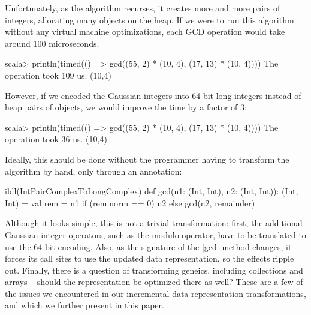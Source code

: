 Unfortunately, as the algorithm recurses, it creates more and more pairs of integers, allocating many objects on the heap. If we were to run this algorithm without any virtual machine optimizations, each GCD operation would take around 100 microseconds.

\begin{lstlisting-nobreak}
scala> println(timed(() => gcd((55, 2) * (10, 4), (17, 13) * (10, 4))))
The operation took 109 us.
(10,4)
\end{lstlisting-nobreak}

However, if we encoded the Gaussian integers into 64-bit long integers instead of heap pairs of objects, we would improve the time by a factor of 3:

\begin{lstlisting-nobreak}
scala> println(timed(() => gcd((55, 2) * (10, 4), (17, 13) * (10, 4))))
The operation took 36 us.
(10,4)
\end{lstlisting-nobreak}

Ideally, this should be done without the programmer having to transform the algorithm by hand, only through an annotation:

\begin{lstlisting-nobreak}
ildl(IntPairComplexToLongComplex) {
  def gcd(n1: (Int, Int), n2: (Int, Int)): (Int, Int) = {
    val rem = n1 %
    if (rem.norm == 0) n2 else gcd(n2, remainder)
  }
}
\end{lstlisting-nobreak}

Although it looks simple, this is not a trivial transformation: first, the additional Gaussian integer operators, such as the modulo operator, have to be translated to use the 64-bit encoding. Also, as the signature of the |gcd| method changes, it forces its call sites to use the updated data representation, so the effects ripple out. Finally, there is a question of transforming geneics, including collections and arrays -- should the representation be optimized there as well? These are a few of the issues we encountered in our incremental data representation transformations, and which we further present in this paper.
